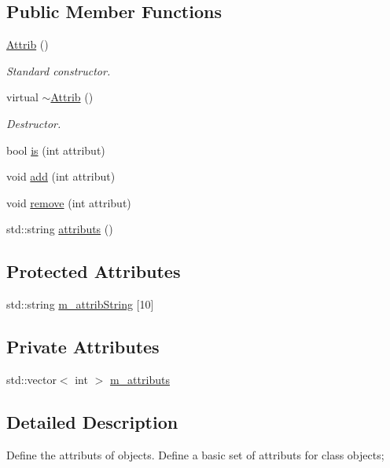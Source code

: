 \subsection*{Public Member Functions}
\begin{DoxyCompactItemize}
\item 
\hyperlink{classAttrib_ae76863db250b64f2779eb11acc5ebe18}{Attrib} ()
\begin{DoxyCompactList}\small\item\em Standard constructor. \item\end{DoxyCompactList}\item 
virtual \hyperlink{classAttrib_a6f3413862312138b87255c2e12dd8326}{$\sim$Attrib} ()
\begin{DoxyCompactList}\small\item\em Destructor. \item\end{DoxyCompactList}\item 
bool \hyperlink{classAttrib_a704f26af560909ad22065083bb7d4c34}{is} (int attribut)
\item 
void \hyperlink{classAttrib_a235f773af19c900264a190b00a3b4ad7}{add} (int attribut)
\item 
void \hyperlink{classAttrib_a7d4ef7e32d93cb287792b87b857e79f3}{remove} (int attribut)
\item 
std::string \hyperlink{classAttrib_aee7bbf16b144887f196e1341b24f8a26}{attributs} ()
\end{DoxyCompactItemize}
\subsection*{Protected Attributes}
\begin{DoxyCompactItemize}
\item 
std::string \hyperlink{classAttrib_a3414521d7a82476e874b25a5407b5e63}{m\_\-attribString} \mbox{[}10\mbox{]}
\end{DoxyCompactItemize}
\subsection*{Private Attributes}
\begin{DoxyCompactItemize}
\item 
std::vector$<$ int $>$ \hyperlink{classAttrib_ac4bd58a0cc6b38a3b711d609a3d3aacc}{m\_\-attributs}
\end{DoxyCompactItemize}


\subsection{Detailed Description}
Define the attributs of objects. Define a basic set of attributs for class objects;

